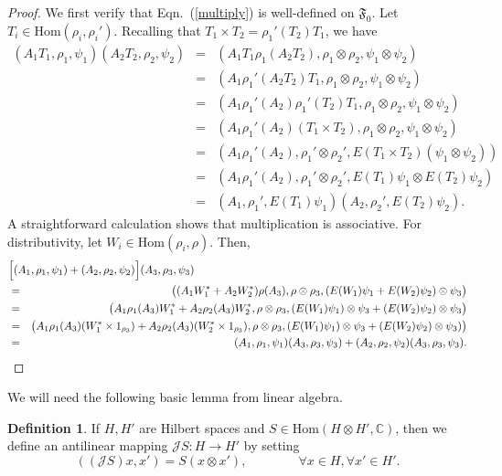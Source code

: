 \documentclass[11pt]{article}
\newcommand{\alg}[1]{\mathfrak{#1}}
\theoremstyle{definition}
\theoremstyle{definition}
\newtheorem{defn}[thm]{Definition}
\theoremstyle{remark}
\def\2#1{{\mathcal #1}}
\def\7#1{{\mathbb #1}}
\newcommand{\Hom}{\mathrm{Hom}}
\begin{document}
\begin{proof} We first verify that Eqn.\ (\ref{multiply}) is well-defined on $\alg{F}_0
  $.  Let $T_i\in \Hom (\rho _i,\rho _i')$.  Recalling that $T_1\times T_2=\rho
  _1'(T_2)T_1$, we have
\begin{eqnarray*}
  (A_1T_1,\rho _1,\psi _1)(A_2T_2,\rho _2,\psi _2) &=& (A_1T_1\rho _1(A_2T_2),\rho
  _1\otimes \rho _2,\psi _1\otimes \psi
  _2) \\
  &=& (A_1\rho _1'(A_2T_2)T_1,\rho _1\otimes \rho _2,\psi _1\otimes \psi _2) \\
  &=& (A_1\rho _1'(A_2)\rho _1'(T_2)T_1,\rho _1\otimes \rho _2,\psi _1\otimes \psi
  _2) \\
  &=& (A_1\rho _1'(A_2)(T_1\times T_2),\rho _1\otimes \rho _2,\psi _1\otimes \psi _2) \\
  &=& (A_1\rho _1'(A_2),\rho _1'\otimes \rho _2',E(T_1\times T_2)(\psi _1\otimes \psi _2)) \\
  &=& (A_1\rho _1'(A_2),\rho _1'\otimes \rho _2',E(T_1)\psi _1\otimes E(T_2)\psi _2) \\
  &=& (A_1,\rho _1',E(T_1)\psi _1)(A_2,\rho _2',E(T_2)\psi _2) .\end{eqnarray*} 
A straightforward calculation shows that multiplication is associative.  For
distributivity, let $W_i\in \Hom (\rho _i,\rho )$.  Then,
\begin{eqnarray*}
  \lefteqn{ \Bigl[ (A_1,\rho _1,\psi _1)+(A_2,\rho _2,\psi _2)\Bigr] (A_3,\rho _3,\psi _3) } \\
  &=& \bigl( (A_1W_1^*+A_2W_2^*)\rho
  (A_3),\rho \otimes \rho _3,(E(W_1)\psi _1+E(W_2)\psi _2)\otimes \psi _3 \bigr) \\
  &=& \bigl( A_1\rho _1(A_3)W_1^{*}+A_2\rho _2(A_3)W_2^*,\rho \otimes \rho _3,(E(W_1)\psi _1)\otimes \psi
  _3+(E(W_2)\psi _2)\otimes \psi _3 \bigr) \\
  &=& \bigl( A_1\rho _1(A_3)(W_1^{*}\times 1_{\rho _3})+A_2\rho _2(A_3)(W_2^*\times 1_{\rho
    _3}), \rho \otimes \rho _3,(E(W_1)\psi _1)\otimes \psi _3+(E(W_2)\psi _2)\otimes \psi _3 ) \bigr) \\
  &=& (A_1,\rho _1,\psi _1)(A_3,\rho _3,\psi _3)+(A_2,\rho _2,\psi _2)(A_3,\rho _3,\psi _3) .\end{eqnarray*}
\end{proof}

We will need the following basic lemma from linear algebra.

\begin{defn} If $H,H'$ are Hilbert spaces and $S\in \Hom (H\otimes H',\7C )$, then we
  define an antilinear mapping $\2JS:H\to H'$ by setting
  \[ ((\2JS)x,x')=S(x\otimes x') ,\qquad \qquad \forall x\in H,\forall
    x'\in H'.\]
\end{defn}
\end{document}
